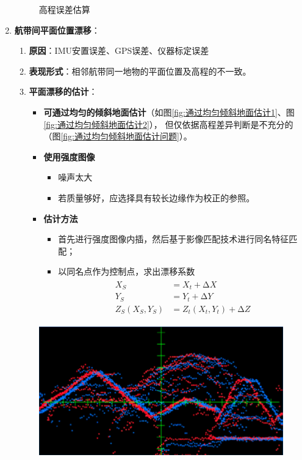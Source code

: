 \begin{enumerate}
\begin{figure}[htbp]
			\caption{高程误差估算}
			\label{fig:高程误差估算}
		\end{figure}
	\item \textbf{航带间平面位置漂移}：
		\begin{enumerate}
			\item \textbf{原因}：IMU安置误差、GPS误差、仪器标定误差
			\item \textbf{表现形式}：相邻航带同一地物的平面位置及高程的不一致。
			\item \textbf{平面漂移的估计}：
				\begin{itemize}
					\item \textbf{可通过均匀的倾斜地面估计}（如图\ref{fig:通过均匀倾斜地面估计1}、图\ref{fig:通过均匀倾斜地面估计2}），
						但仅依据高程差异判断是不充分的（图\ref{fig:通过均匀倾斜地面估计问题}）。
					\item \textbf{使用强度图像}
						\begin{itemize}
							\item 噪声太大
							\item 若质量够好，应选择具有较长边缘作为校正的参照。
						\end{itemize}
					\item \textbf{估计方法}
						\begin{itemize}
							\item 首先进行强度图像内插，然后基于影像匹配技术进行同名特征匹配；
							\item 以同名点作为控制点，求出漂移系数
								\begin{align}
									\begin{split}
										X_S          & = X_t + ∆X          \\
										Y_S          & = Y_t + ∆Y          \\
										Z_S(X_S,Y_S) & = Z_t(X_t,Y_t) + ∆Z
									\end{split}
								\end{align}
						\end{itemize}
				\end{itemize}
		\end{enumerate}
		\begin{figure}[htbp]
			\centering
			\includegraphics[width=0.5\linewidth]{figure/Chapter8/航带间平面位置漂移}

\end{figure}
\end{enumerate}
